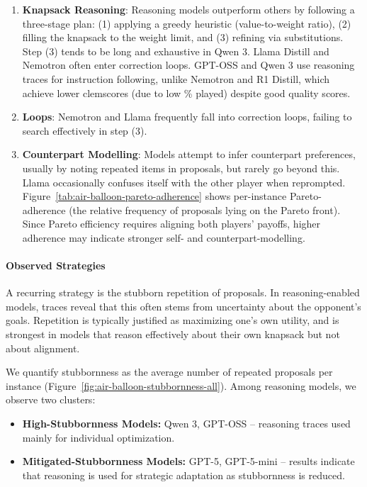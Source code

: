 \documentclass[../main.tex]{subfiles}
\begin{document}
\begin{enumerate}
    \item \textbf{Knapsack Reasoning}: Reasoning models outperform others by following a three-stage plan: (1) applying a greedy heuristic (value-to-weight ratio), (2) filling the knapsack to the weight limit, and (3) refining via substitutions. Step (3) tends to be long and exhaustive in Qwen 3. Llama Distill and Nemotron often enter correction loops. GPT-OSS and Qwen 3 use reasoning traces for instruction following, unlike Nemotron and R1 Distill, which achieve lower clemscores (due to low \% played) despite good quality scores.
    \item \textbf{Loops}: Nemotron and Llama frequently fall into correction loops, failing to search effectively in step (3).
    \item \textbf{Counterpart Modelling}: Models attempt to infer counterpart preferences, usually by noting repeated items in proposals, but rarely go beyond this. Llama occasionally confuses itself with the other player when reprompted. Figure~\ref{tab:air-balloon-pareto-adherence} shows per-instance Pareto-adherence (the relative frequency of proposals lying on the Pareto front). Since Pareto efficiency requires aligning both players’ payoffs, higher adherence may indicate stronger self- and counterpart-modelling.
\end{enumerate}


\paragraph{Observed Strategies}
A recurring strategy is the stubborn repetition of proposals. In reasoning-enabled models, traces reveal that this often stems from uncertainty about the opponent’s goals. Repetition is typically justified as maximizing one’s own utility, and is strongest in models that reason effectively about their own knapsack but not about alignment. 

We quantify stubbornness as the average number of repeated proposals per instance (Figure~\ref{fig:air-balloon-stubbornness-all}). Among reasoning models, we observe two clusters:
\begin{itemize}
    \item \textbf{High-Stubbornness Models:} Qwen 3, GPT-OSS – reasoning traces used mainly for individual optimization.
    \item \textbf{Mitigated-Stubbornness Models:} GPT-5, GPT-5-mini – results indicate that reasoning is used for strategic adaptation as stubbornness is reduced.
\end{itemize}
\end{document}
